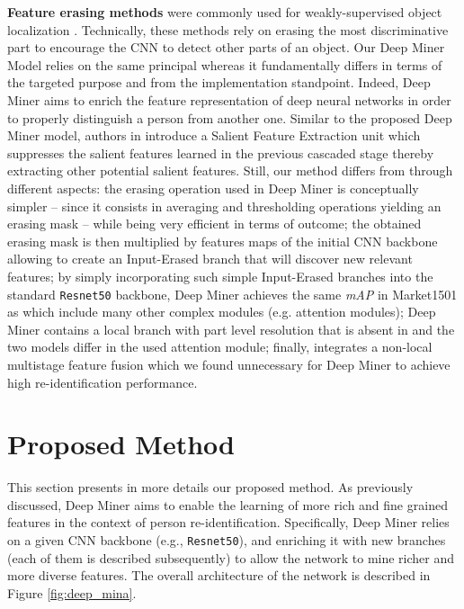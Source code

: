 \documentclass[final]{cvpr}
\begin{document}
\textbf{Feature erasing methods} were commonly used for weakly-supervised object localization \cite{zhang2018adversarial,choe2019attention, benassou2020hierarchical}. Technically, these methods rely on erasing the most discriminative part to encourage the CNN to detect other parts of an object. Our Deep Miner Model relies on the same principal whereas it fundamentally differs in terms of the targeted purpose and from the implementation standpoint. Indeed, Deep Miner aims to enrich the feature representation of deep neural networks in order to properly distinguish a person from another one. Similar to the proposed Deep Miner model, authors in \cite{chen2020salience} introduce a Salient Feature Extraction unit which suppresses the salient features learned in the previous cascaded stage thereby extracting other potential salient features. Still, our method differs from \cite{chen2020salience} through different aspects:  the erasing operation used in Deep Miner is conceptually simpler -- since it consists in averaging and thresholding operations yielding an erasing mask -- while being very efficient in terms of outcome;  the obtained erasing mask is then multiplied by features maps of the initial CNN backbone allowing to create an Input-Erased branch that will discover new relevant features;  by simply incorporating such simple Input-Erased branches into the standard \texttt{Resnet50} backbone, Deep Miner achieves the same \textit{mAP} in Market1501 as \cite{chen2020salience} which include many other complex modules (e.g. attention modules);  Deep Miner contains a local branch with part level resolution that is absent in \cite{chen2020salience} and the two models differ in the used attention module;  finally, \cite{chen2020salience} integrates a non-local multistage feature fusion which we found unnecessary for Deep Miner to achieve high re-identification performance. 



\section{Proposed Method}
This section presents in more details our proposed method. As previously discussed, Deep Miner aims to enable the learning of more rich and fine grained features in the context of person re-identification. Specifically, Deep Miner relies on a given CNN backbone (e.g., \texttt{Resnet50}), and enriching it with new branches (each of them is described subsequently) to allow the network to mine richer and more diverse features.  The overall architecture of the network is described in Figure \ref{fig:deep_mina}. 
\end{document}
